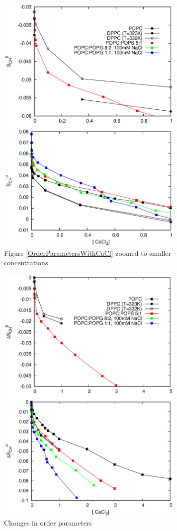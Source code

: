 \documentclass[aps,prl,superscriptaddress,twocolumn]{revtex4}
\begin{document}
\begin{figure}[]
  \centering
  \includegraphics[width=9.0cm]{../Figs/LIPIDSwithCaClBELOW1M.eps}
  \caption{\label{OrderParametersWithCaClBELOW1M}
    Figure \ref{OrderParametersWithCaCl} zoomed to smaller concentrations.
  }
\end{figure}
\begin{figure}[]
  \centering
  \includegraphics[width=9.0cm]{../Figs/CHANGESwithCaClBELOW1M.eps}
  \caption{\label{OrderParameterCHANGESWithCaClBELOW1M}
    Changes in order parameters
  }
\end{figure}
\end{document}
